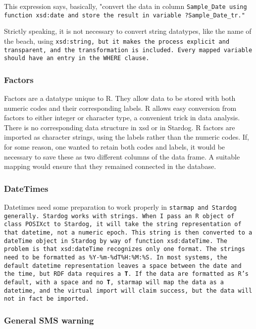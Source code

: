 \documentclass{article}\usepackage[]{graphicx}\usepackage[]{xcolor}
\begin{document}
This expression says, basically, "convert the data in column \tt{Sample\_Date} using function \tt{xsd:date} and store the result in variable \tt{?Sample\_Date\_tr}."

Strictly speaking, it is not necessary to convert string datatypes, like the name of the beach, using \tt{xsd:string}, but it makes the process explicit and transparent, and the transformation is included. Every mapped variable should have an entry in the \tt{WHERE} clause.

\subsubsection{Factors}

Factors are a datatype unique to R. They allow data to be stored with both numeric codes and their corresponding labels. R allows easy conversion from factors to either integer or character type, a convenient trick in data analysis. There is no corresponding data structure in xsd or in Stardog. R factors are imported as character strings, using the labels rather than the numeric codes. If, for some reason, one wanted to retain both codes and labels, it would be necessary to save these as two different columns of the data frame. A suitable mapping would ensure that they remained connected in the database.

\subsubsection{DateTimes}

Datetimes need some preparation to work properly in \tt{starmap} and Stardog generally. Stardog works with strings. When I pass an R object of class \texttt{POSIXct} to Stardog, it will take the string representation of that datetime, not a numeric epoch. This string is then converted to a dateTime object in Stardog by way of function \texttt{xsd:dateTime}. The problem is that \texttt{xsd:dateTime} recognizes only one format. The strings need to be formatted as \texttt{\%Y-\%m-\%dT\%H:\%M:\%S}. In most systems, the default datetime representation leaves a space between the date and the time, but RDF data requires a \textbf{T}. If the data are formatted as R's default, with a space and no \textbf{T}, \tt{starmap} will map the data as a datetime, and the virtual import will claim success, but the data will not in fact be imported.

\subsubsection{General SMS warning}
\end{document}
